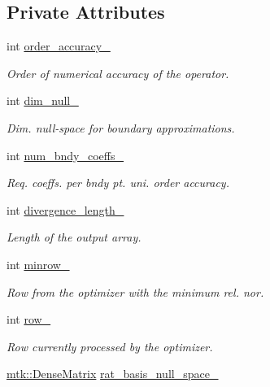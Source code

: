 \subsection*{Private Attributes}
\begin{DoxyCompactItemize}
\item 
int \hyperlink{classmtk_1_1Div1D_a9c8a8d7cd08a72dbd1daa8deee06f9c6}{order\-\_\-accuracy\-\_\-}
\begin{DoxyCompactList}\small\item\em Order of numerical accuracy of the operator. \end{DoxyCompactList}\item 
int \hyperlink{classmtk_1_1Div1D_a264027144def76d802778391f55381a0}{dim\-\_\-null\-\_\-}
\begin{DoxyCompactList}\small\item\em Dim. null-\/space for boundary approximations. \end{DoxyCompactList}\item 
int \hyperlink{classmtk_1_1Div1D_a717240b41eaa2adde858630b9e3d3042}{num\-\_\-bndy\-\_\-coeffs\-\_\-}
\begin{DoxyCompactList}\small\item\em Req. coeffs. per bndy pt. uni. order accuracy. \end{DoxyCompactList}\item 
int \hyperlink{classmtk_1_1Div1D_ac0f152190cd2fbff62deb07f96284f86}{divergence\-\_\-length\-\_\-}
\begin{DoxyCompactList}\small\item\em Length of the output array. \end{DoxyCompactList}\item 
int \hyperlink{classmtk_1_1Div1D_a0ba7a75cca6cf3646deb7a030cbbf3f3}{minrow\-\_\-}
\begin{DoxyCompactList}\small\item\em Row from the optimizer with the minimum rel. nor. \end{DoxyCompactList}\item 
int \hyperlink{classmtk_1_1Div1D_a86d99df0e9b1e5d2943a2dcf58975556}{row\-\_\-}
\begin{DoxyCompactList}\small\item\em Row currently processed by the optimizer. \end{DoxyCompactList}\item 
\hyperlink{classmtk_1_1DenseMatrix}{mtk\-::\-Dense\-Matrix} \hyperlink{classmtk_1_1Div1D_a262b15fcb272c934395a1f744aef669d}{rat\-\_\-basis\-\_\-null\-\_\-space\-\_\-}

\end{DoxyCompactItemize}
